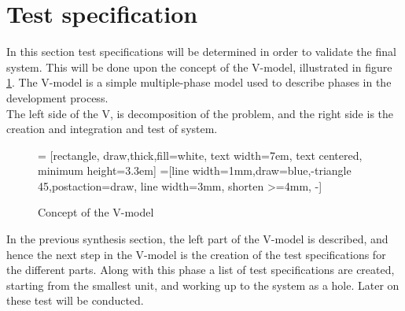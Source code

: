 \section{Test specification}
In this section test specifications will be determined in order to validate the final system. This will be done upon the concept of the V-model\cite{vmodel}, illustrated in figure \ref{fig:vmodel}.         
The V-model is a simple multiple-phase model used to describe phases in the development process. \\
The left side of the V, is decomposition of the problem, and the right side is the creation and integration and test of system.
\begin{figure}[h]
\centering
{} = [rectangle, draw,thick,fill=white, 
    text width=7em, text centered, minimum height=3.3em]
=[line width=1mm,draw=blue,-triangle 45,postaction={draw, line width=3mm, shorten >=4mm, -}]
\caption{Concept of the V-model}
\label{fig:vmodel}
\end{figure}
In the previous synthesis section, the left part of the V-model is described, and hence the next step in the V-model is the creation of the test specifications for the different parts. Along with this phase a list of test specifications are created, starting from the smallest unit, and working up to the system as a hole. Later on these test will be conducted.\\
\\
